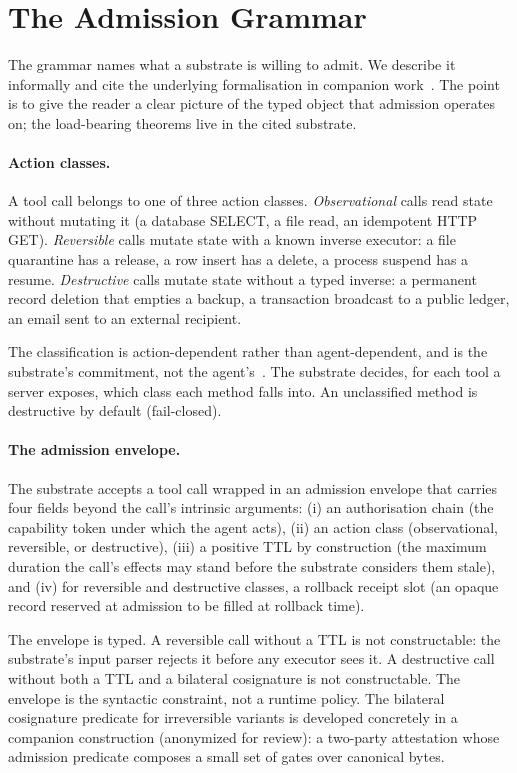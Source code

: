 \section{The Admission Grammar}
\label{sec:grammar}

The grammar names what a substrate is willing to admit. We describe it informally and cite the underlying formalisation in companion work~\cite{programmableSovereignty2026}. The point is to give the reader a clear picture of the typed object that admission operates on; the load-bearing theorems live in the cited substrate.

\paragraph{Action classes.}
A tool call belongs to one of three action classes. \emph{Observational} calls read state without mutating it (a database SELECT, a file read, an idempotent HTTP GET). \emph{Reversible} calls mutate state with a known inverse executor: a file quarantine has a release, a row insert has a delete, a process suspend has a resume. \emph{Destructive} calls mutate state without a typed inverse: a permanent record deletion that empties a backup, a transaction broadcast to a public ledger, an email sent to an external recipient.

The classification is action-dependent rather than agent-dependent, and is the substrate's commitment, not the agent's~\cite{programmableSovereignty2026}. The substrate decides, for each tool a server exposes, which class each method falls into. An unclassified method is destructive by default (fail-closed).

\paragraph{The admission envelope.}
The substrate accepts a tool call wrapped in an admission envelope that carries four fields beyond the call's intrinsic arguments: (i) an authorisation chain (the capability token under which the agent acts), (ii) an action class (observational, reversible, or destructive), (iii) a positive TTL by construction (the maximum duration the call's effects may stand before the substrate considers them stale), and (iv) for reversible and destructive classes, a rollback receipt slot (an opaque record reserved at admission to be filled at rollback time).

The envelope is typed. A reversible call without a TTL is not constructable: the substrate's input parser rejects it before any executor sees it. A destructive call without both a TTL and a bilateral cosignature is not constructable. The envelope is the syntactic constraint, not a runtime policy. The bilateral cosignature predicate for irreversible variants is developed concretely in a companion construction (anonymized for review): a two-party attestation whose admission predicate composes a small set of gates over canonical bytes.

